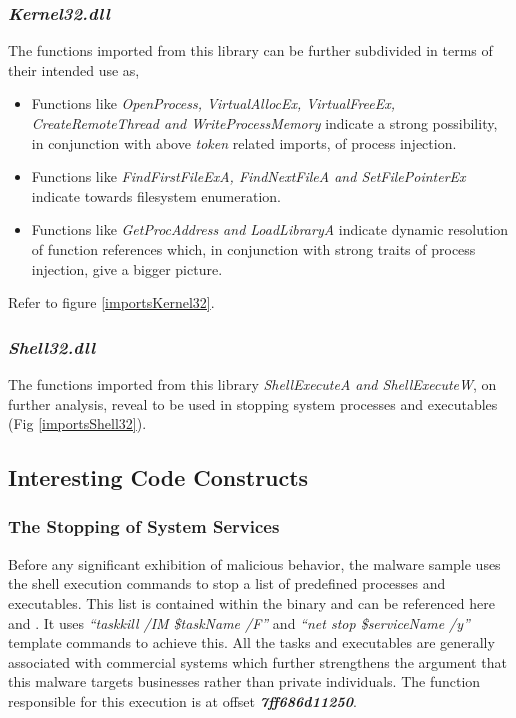 \documentclass[10pt,a4paper]{article}
\begin{document}
		\subsubsection*{\textit{Kernel32.dll}}
		\vspace{-1em}
		The functions imported from this library can be further subdivided in terms of their intended use as,
		\begin{itemize}
		\vspace{-1em}
			\item Functions like \textit{OpenProcess, VirtualAllocEx, VirtualFreeEx, CreateRemoteThread and WriteProcessMemory} indicate a strong possibility, in conjunction with above \textit{token} related imports, of process injection.
			\item Functions like \textit{FindFirstFileExA, FindNextFileA and SetFilePointerEx} indicate towards filesystem enumeration.
			\item Functions like \textit{GetProcAddress and LoadLibraryA} indicate dynamic resolution of function references  which, in conjunction with strong traits of process injection, give a bigger picture.
		\end{itemize}
		Refer to figure \ref{importsKernel32}.

		\subsubsection*{\textit{Shell32.dll}}
		\vspace{-1em}
		The functions imported from this library \textit{ShellExecuteA and ShellExecuteW}, on further analysis, reveal to be used in stopping system processes and executables (Fig \ref{importsShell32}).

	\subsection{Interesting Code Constructs}
		\subsubsection*{The Stopping of System Services}
		\vspace{-1em}
		Before any significant exhibition of malicious behavior, the malware sample uses the shell execution commands to stop a list of predefined processes and executables.
		This list is contained within the binary and can be referenced here \cite{stoppedServices} and \cite{stoppedProcesses}.
		It uses \textit{``taskkill /IM \${taskName} /F''} and \textit{``net stop \${serviceName} /y''} template commands to achieve this.
		All the tasks and executables are generally associated with commercial systems which further strengthens the argument that this malware targets businesses rather than private individuals.
		The function responsible for this execution is at offset \textit{\textbf{7ff686d11250}}.
\end{document}
